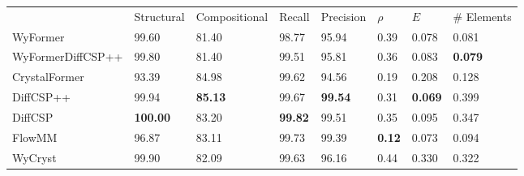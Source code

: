 \begin{tabular}{llllllll}
{} & {Structural} & {Compositional} & {Recall} & {Precision} & {$\rho$} & {$E$} & {# Elements} \\
WyFormer & 99.60 & 81.40 & 98.77 & 95.94 & 0.39 & 0.078 & 0.081 \\
WyFormerDiffCSP++ & 99.80 & 81.40 & 99.51 & 95.81 & 0.36 & 0.083 & \bfseries 0.079 \\
CrystalFormer & 93.39 & 84.98 & 99.62 & 94.56 & 0.19 & 0.208 & 0.128 \\
DiffCSP++ & 99.94 & \bfseries 85.13 & 99.67 & \bfseries 99.54 & 0.31 & \bfseries 0.069 & 0.399 \\
DiffCSP & \bfseries 100.00 & 83.20 & \bfseries 99.82 & 99.51 & 0.35 & 0.095 & 0.347 \\
FlowMM & 96.87 & 83.11 & 99.73 & 99.39 & \bfseries 0.12 & 0.073 & 0.094 \\
WyCryst & 99.90 & 82.09 & 99.63 & 96.16 & 0.44 & 0.330 & 0.322 \\
\end{tabular}
